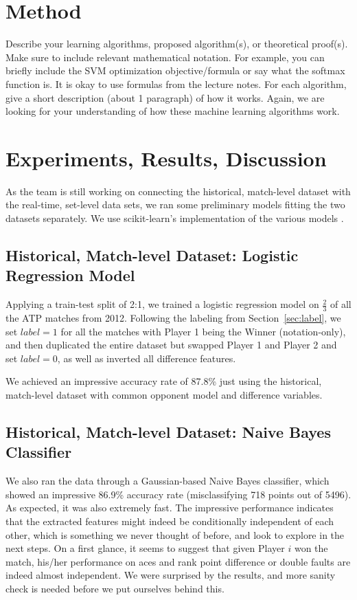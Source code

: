 \documentclass[paper=a4, fontsize=11pt]{scrartcl} %
\numberwithin{equation}{section} %
\numberwithin{figure}{section} %
\numberwithin{table}{section} %
\begin{document}
\section{Method}
Describe your learning algorithms, proposed algorithm(s), or theoretical proof(s). Make sure to include relevant mathematical notation. For example, you can briefly include the SVM optimization objective/formula or say what the softmax function is. It is okay to use formulas from the lecture notes. For each algorithm, give a short description (about 1 paragraph) of how it works. Again, we are looking for your understanding of how these machine learning algorithms work. 



\section{Experiments, Results, Discussion}
As the team is still working on connecting the historical, match-level dataset with the real-time, set-level data sets, we ran some preliminary models fitting the two datasets separately. We use scikit-learn's implementation of the various models \cite{scikit-learn}.
\subsection{Historical, Match-level Dataset: Logistic Regression Model}
Applying a train-test split of 2:1, we trained a logistic regression model on $\frac{2}{3}$ of all the ATP matches from 2012. Following the labeling from Section~\ref{sec:label}, we set $label = 1$ for all the matches with Player 1 being the Winner (notation-only), and then duplicated the entire dataset but swapped Player 1 and Player 2 and set $label = 0$, as well as inverted all difference features.

We achieved an impressive accuracy rate of 87.8\% just using the historical, match-level dataset with common opponent model and difference variables. 

\subsection{Historical, Match-level Dataset: Naive Bayes Classifier}
We also ran the data through a Gaussian-based Naive Bayes classifier, which showed an impressive 86.9\% accuracy rate (misclassifying 718 points out of 5496). As expected, it was also extremely fast. The impressive performance indicates that the extracted features might indeed be conditionally independent of each other, which is something we never thought of before, and look to explore in the next steps. On a first glance, it seems to suggest that given Player $i$ won the match, his/her performance on aces and rank point difference or double faults are indeed almost independent. We were surprised by the results, and more sanity check is needed before we put ourselves behind this. 
\end{document}
